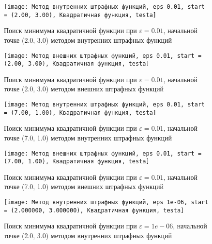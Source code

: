 \begin{table}[H]
\begin{tabular}{|c|c|c|c|}
\end{tabular}
\end{table}


            \begin{figure}[H]
	        \centering
	        \texttt{[image: Метод внутренних штрафных функций, eps 0.01, start = (2.00, 3.00), Квадратичная функция, testa]}%
	        \caption{Поиск минимума квадратичной функции при $\varepsilon = 0.01$, начальной точке (2.0, 3.0) методом внутренних штрафных функций}
	        \vspace*{-1.2cm}
            \end{figure}
            
            \begin{figure}[H]
	        \centering
	        \texttt{[image: Метод внешних штрафных функций, eps 0.01, start = (2.00, 3.00), Квадратичная функция, testa]}%
	        \caption{Поиск минимума квадратичной функции при $\varepsilon = 0.01$, начальной точке (2.0, 3.0) методом внешних штрафных функций}
	        \vspace*{-1.2cm}
            \end{figure}
            
            \begin{figure}[H]
	        \centering
	        \texttt{[image: Метод внутренних штрафных функций, eps 0.01, start = (7.00, 1.00), Квадратичная функция, testa]}%
	        \caption{Поиск минимума квадратичной функции при $\varepsilon = 0.01$, начальной точке (7.0, 1.0) методом внутренних штрафных функций}
	        \vspace*{-1.2cm}
            \end{figure}
            
            \begin{figure}[H]
	        \centering
	        \texttt{[image: Метод внешних штрафных функций, eps 0.01, start = (7.00, 1.00), Квадратичная функция, testa]}%
	        \caption{Поиск минимума квадратичной функции при $\varepsilon = 0.01$, начальной точке (7.0, 1.0) методом внешних штрафных функций}
	        \vspace*{-1.2cm}
            \end{figure}
            
            \begin{figure}[H]
	        \centering
	        \texttt{[image: Метод внутренних штрафных функций, eps 1e-06, start = (2.000000, 3.000000), Квадратичная функция, testa]}%
	        \caption{Поиск минимума квадратичной функции при $\varepsilon = 1e-06$, начальной точке (2.0, 3.0) методом внутренних штрафных функций}
	        \vspace*{-1.2cm}
            \end{figure}
            
